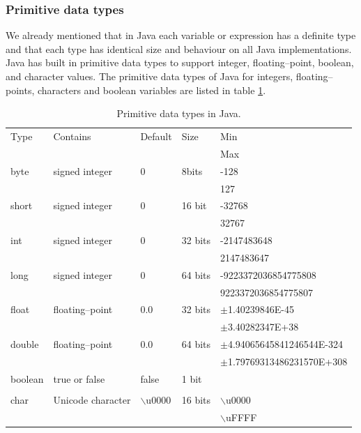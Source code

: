 \subsubsection{Primitive data types}
\label{sec:primitive_data_types}
We already mentioned that in Java each variable or expression has a
definite type and that each type has identical size and behaviour on
all Java implementations.  Java has built in primitive data types
to support integer, floating--point, boolean, and character values.
The primitive data types of Java for integers, floating--points,
characters and boolean variables are listed in table
\ref{table:primitivedata}.
\begin{table}[htbp]
\label{table:primitivedata}
\begin{center}
\begin{tabular}{l|l|l|l|l}
Type & Contains & Default & Size & Min \\
     &          &         &      & Max \\ \hline \hline
byte  & signed integer & 0 & 8bits & -128  \\
&&& & 127    \\ \hline
short & signed integer & 0 & 16 bit &-32768 \\
&&& & 32767 \\ \hline
int &   signed integer & 0 & 32 bits&-2147483648 \\
&&& &2147483647 \\ \hline
long & signed integer & 0 & 64 bits &-9223372036854775808\\
&&& &9223372036854775807\\ \hline
float & floating--point & 0.0 & 32 bits &$\pm$1.40239846E-45\\
&&& &$\pm$3.40282347E+38\\ \hline
double & floating--point & 0.0 & 64 bits &$\pm$4.94065645841246544E-324\\
&&& &$\pm$1.79769313486231570E+308\\ \hline
boolean & true or false      &  false & 1 bit&\\
&&&       &  \\ \hline
char  & Unicode character & $\backslash$u0000 & 16 bits & $\backslash$u0000 \\
&&& &$\backslash$uFFFF   \\ \hline
\end{tabular}
\end{center}
\caption{Primitive data types in Java.}
\end{table}


